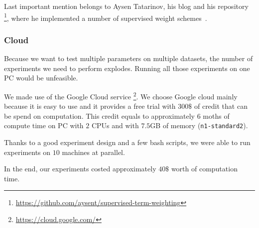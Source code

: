     Last important mention belongs to Aysen Tatarinov, his blog and his repository \footnote{\url{https://github.com/aysent/supervised-term-weighting}}, where he implemented a number of supervised weight schemes~\cite{maas2011learning}.
    \* %
    
    
    \subsubsection{Cloud} 
    Because we want to test multiple parameters on multiple datasets, the number of experiments we need to perform explodes.
    Running all those experiments on one PC would be unfeasible.
    
    We made use of the Google Cloud service \footnote{\url{https://cloud.google.com/}}.
    We choose Google cloud mainly because it is easy to use and it provides a free trial with $300\$$ of credit that can be spend on computation. 
    This credit equals to approximately $6$ moths of compute time on PC with $2$ CPUs and with $7.5$GB of memory (\texttt{n1-standard2}).
    
    Thanks to a good experiment design and a few bash scripts,
    we were able to run experiments on $10$ machines at parallel.
    
    
    In the end, our experiments costed approximately $40\$$ worth of computation time.
    